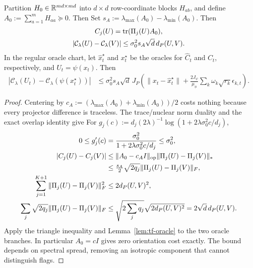 \begin{proposition}
\label{prop:directional-tracking}
Partition $H_0\in\mathbb R^{md\times md}$ into $d\times d$ row-coordinate blocks
$H_{ab}$, and define $A_0:=\sum_{a=1}^m H_{aa}\succeq0$. Then
Set $s_A:=\lambda_{\max}(A_0)-\lambda_{\min}(A_0)$. Then
\begin{gather}
 C_j(U)=\operatorname{tr}(\Pi_j(U)A_0),\\
 |\mathcal C_\lambda(U)-\mathcal C_\lambda(V)|
 \le\sigma_0^2 s_A\sqrt d\,d_P(U,V).
\end{gather}
In the regular oracle chart, let $\widehat x_t^\star$ and $x_t^\star$ be the
oracles for $\widehat C_t$ and $C_t$, respectively, and $U_t=\psi(x_t)$. Then
\begin{align}
 |\mathcal C_\lambda(U_t)-\mathcal C_\lambda(\psi(x_t^\star))|
 &\le\sigma_0^2 s_A\sqrt d\,J_P
 \left(\|x_t-\widehat x_t^\star\|+
     \frac{2J_\psi}{\mu_\phi}\sum_k\omega_k\sqrt{r_k}\epsilon_{k,t}\right).
\end{align}
\end{proposition}
\begin{proof}
Centering by $c_A:=(\lambda_{\max}(A_0)+\lambda_{\min}(A_0))/2$ costs
nothing because every projector difference is traceless. The trace/nuclear
norm duality and the exact overlap identity give
For $g_j(c):=d_j(2\lambda)^{-1}\log(1+2\lambda\sigma_0^2c/d_j)$,
\begin{align}
 0\le g_j'(c)&=\frac{\sigma_0^2}{1+2\lambda\sigma_0^2c/d_j}\le\sigma_0^2,\\
 |C_j(U)-C_j(V)|
 &\le\|A_0-c_AI\|_{\mathrm{op}}\|\Pi_j(U)-\Pi_j(V)\|_*\\
 &\le\tfrac{s_A}{2}\sqrt{2q_j}\|\Pi_j(U)-\Pi_j(V)\|_F,\\
 \sum_{j=1}^{K+1}\|\Pi_j(U)-\Pi_j(V)\|_F^2
 &\le2d_P(U,V)^2,\\
 \sum_j\sqrt{2q_j}\|\Pi_j(U)-\Pi_j(V)\|_F
 &\le\sqrt{2\sum_jq_j}\sqrt{2d_P(U,V)^2}=2\sqrt d\,d_P(U,V).
\end{align}
Apply the triangle inequality and Lemma~\ref{lem:tf-oracle} to the two oracle branches.
In particular $A_0=cI$ gives zero orientation cost exactly. The bound depends
on spectral spread, removing an isotropic component that cannot distinguish flags.
\end{proof}
